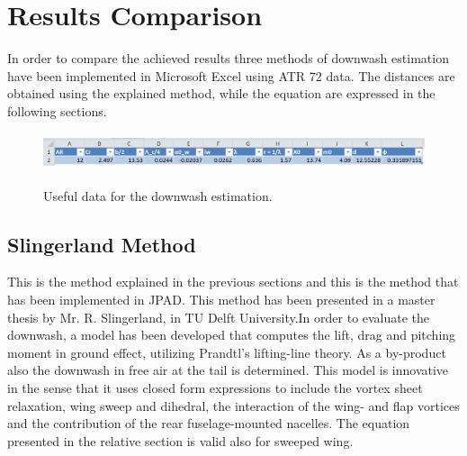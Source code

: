 \section{Results Comparison}

In order to compare the achieved results three methods of downwash estimation have been implemented in Microsoft Excel using ATR 72 data. The distances are obtained using the explained method, while the equation are expressed in the following sections.



\begin{figure}[H]
	\centering
{\includegraphics[height=1.1cm]{Immagini/datadownwash.png}} 
	\caption{Useful data for the downwash estimation.}
	\label{usefuldata}
\end{figure}

\subsection {Slingerland Method }

This is the method explained in the previous sections and this is the method that has been implemented in JPAD. This method has been presented in a master thesis by Mr. R. Slingerland, in TU Delft University.In order to evaluate the downwash, a model has been developed that computes the lift, drag and pitching moment in ground effect, utilizing Prandtl's lifting-line theory. As a by-product also the downwash in free air at the tail is determined. This model is innovative in the sense that it uses closed form expressions to include the vortex sheet relaxation, wing sweep and dihedral, the interaction of the wing- and flap vortices and the contribution of the rear fuselage-mounted nacelles. The equation presented in the relative section is valid also for sweeped wing.

